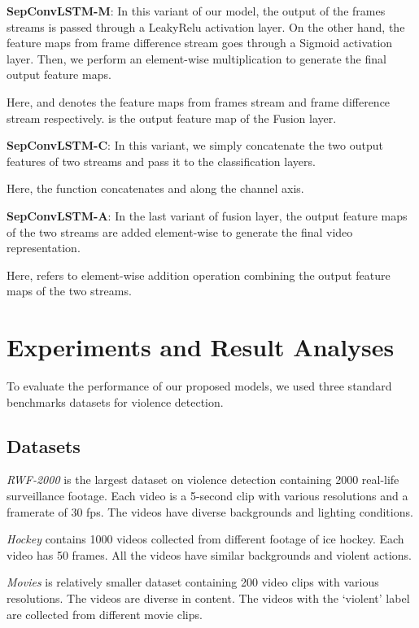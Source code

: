 \documentclass[conference]{IEEEtran}
\begin{document}
\textbf{SepConvLSTM-M}: In this variant of our model, the output of the frames streams is passed through a LeakyRelu activation layer. On the other hand, the feature maps from frame difference stream goes through a Sigmoid activation layer. Then, we perform an element-wise multiplication to generate the final output feature maps. 

Here,  and  denotes the feature maps from frames stream and frame difference stream respectively.  is the output feature map of the Fusion layer.

\textbf{SepConvLSTM-C}: In this variant, we simply concatenate the two output features of two streams and pass it to the classification layers.  

Here, the  function concatenates  and  along the channel axis.

\textbf{SepConvLSTM-A}: In the last variant of fusion layer, the output feature maps of the two streams are added element-wise to generate the final video representation. 

Here,  refers to element-wise addition operation combining the output feature maps of the two streams.







\section{Experiments and Result Analyses}
To evaluate the performance of our proposed models, we used three standard benchmarks datasets for violence detection.

\subsection{Datasets}

\emph{RWF-2000} \cite{cheng2019rwf} is the largest dataset on violence detection containing 2000 real-life surveillance footage. Each video is a 5-second clip with various resolutions and a framerate of 30 fps. The videos have diverse backgrounds and lighting conditions.

\emph{Hockey} \cite{nievas2011violence} contains 1000 videos collected from different footage of ice hockey. Each video has 50 frames. All the videos have similar backgrounds and violent actions.

\emph{Movies} \cite{nievas2011violence} is relatively smaller dataset containing 200 video clips with various resolutions. The videos are diverse in content. The videos with the `violent' label are collected from different movie clips.
\end{document}
